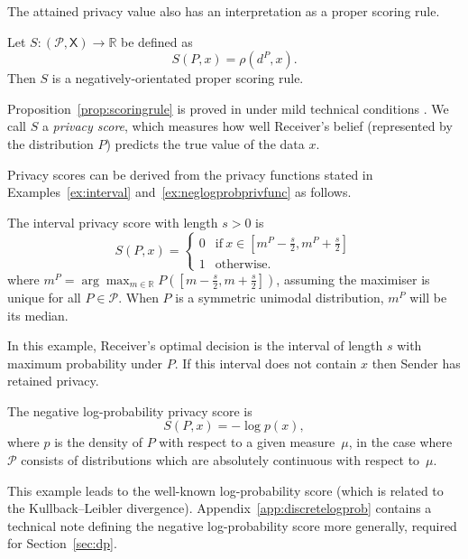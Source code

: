 \documentclass{article}
\theoremstyle{plain}
\theoremstyle{plain}
\theoremstyle{definition}
\theoremstyle{remark}
\theoremstyle{plain}
\newcommand{\priv}{S}
\newcommand{\xset}{\mathsf{X}}
\begin{document}
The attained privacy value also has an interpretation as a proper scoring rule.
\begin{proposition}\label{prop:scoringrule}
    Let $\priv:(\mathcal{P},\xset)\rightarrow \mathbb{R}$ be defined as 
\begin{equation*}
    \priv(P,x) = \rho(d^{P},x).
\end{equation*}
Then $\priv$ is a negatively-orientated proper scoring rule.
\end{proposition} Proposition~\ref{prop:scoringrule} is proved in \citet[Section 3.4,][]{grunwald2004game} under mild technical conditions \citep[see also,][]{dawid2005geometry,dawid2007geometry}. We call $S$ a \textit{privacy score}, which measures how well Receiver's belief (represented by the distribution $P$) predicts the true value of the data $x$.

Privacy scores can be derived from the privacy functions stated in Examples~\ref{ex:interval} and~\ref{ex:neglogprobprivfunc} as follows. 
\begin{example}[continues=ex:interval]
    The interval privacy score with length $s > 0$ is
\begin{equation*}
        S(P,x) = \begin{cases}
            0 & \text{if}~ x\in [m^P-\frac{s}{2},m^P + \frac{s}{2}]\\
            1 & \text{otherwise}.
        \end{cases}
\end{equation*}
where $m^P = \arg\max_{m \in \mathbb{R}} P([m-\frac{s}{2},m+\frac{s}{2}])$, assuming the maximiser is unique for all $P \in \mathcal{P}$. When $P$ is a symmetric unimodal distribution, $m^P$ will be its median.
\end{example}
In this example, Receiver's optimal decision is the interval of length $s$ with maximum probability under $P$. If this interval does not contain $x$ then Sender has retained privacy. 
\begin{example}[continues=ex:neglogprobprivfunc]
    The negative log-probability privacy score is
    \begin{equation*}
        S(P,x) = - \log p(x),
    \end{equation*}
    where $p$ is the density of $P$ with respect to a given measure~$\mu$, in the case where $\mathcal P$ consists of distributions which are absolutely continuous with respect to~$\mu$.
\end{example}
This example leads to the well-known log-probability score (which is related to the Kullback–Leibler divergence). Appendix~\ref{app:discretelogprob} contains a technical note defining the negative log-probability score more generally, required for Section~\ref{sec:dp}.
\end{document}

